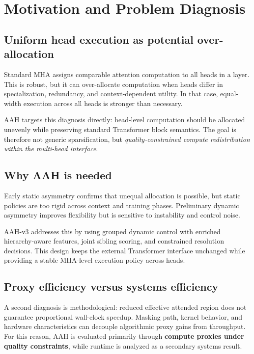 \documentclass[11pt]{article}
\begin{document}
\section{Motivation and Problem Diagnosis}

\subsection{Uniform head execution as potential over-allocation}

Standard MHA assigns comparable attention computation to all heads in a layer. This is robust, but it can over-allocate computation when heads differ in specialization, redundancy, and context-dependent utility. In that case, equal-width execution across all heads is stronger than necessary.

AAH targets this diagnosis directly: head-level computation should be allocated unevenly while preserving standard Transformer block semantics. The goal is therefore not generic sparsification, but \emph{quality-constrained compute redistribution within the multi-head interface}.

\subsection{Why AAH is needed}

Early static asymmetry confirms that unequal allocation is possible, but static policies are too rigid across context and training phases. Preliminary dynamic asymmetry improves flexibility but is sensitive to instability and control noise.

AAH-v3 addresses this by using grouped dynamic control with enriched hierarchy-aware features, joint sibling scoring, and constrained resolution decisions. This design keeps the external Transformer interface unchanged while providing a stable MHA-level execution policy across heads.

\subsection{Proxy efficiency versus systems efficiency}

A second diagnosis is methodological: reduced effective attended region does not guarantee proportional wall-clock speedup. Masking path, kernel behavior, and hardware characteristics can decouple algorithmic proxy gains from throughput. For this reason, AAH is evaluated primarily through \textbf{compute proxies under quality constraints}, while runtime is analyzed as a secondary systems result.
\end{document}
